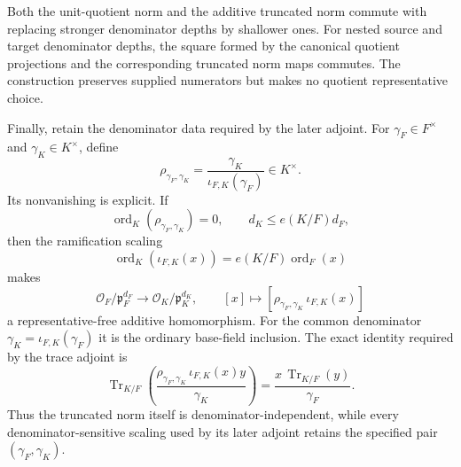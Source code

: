 \begin{definition}
Both the unit-quotient norm and the additive truncated norm commute with
replacing stronger denominator depths by shallower ones.  For nested
source and target denominator depths, the square formed by the canonical
quotient projections and the corresponding truncated norm maps commutes.
The construction preserves supplied numerators but makes no quotient
representative choice.

Finally, retain the denominator data required by the later adjoint.  For
$\gamma_F\in F^\times$ and $\gamma_K\in K^\times$, define
\[
 \rho_{\gamma_F,\gamma_K}
   =\frac{\gamma_K}{\iota_{F,K}(\gamma_F)}\in K^\times.
\]
Its nonvanishing is explicit.  If
\[
 \operatorname{ord}_K(\rho_{\gamma_F,\gamma_K})=0,
 \qquad d_K\leq e(K/F)d_F,
\]
then the ramification scaling
\[
 \operatorname{ord}_K(\iota_{F,K}(x))
   =e(K/F)\operatorname{ord}_F(x)
\]
makes
\[
 \mathcal O_F/\mathfrak p_F^{d_F}
 \longrightarrow
 \mathcal O_K/\mathfrak p_K^{d_K},
 \qquad
 [x]\longmapsto
 [\rho_{\gamma_F,\gamma_K}\,\iota_{F,K}(x)]
\]
a representative-free additive homomorphism.  For the common denominator
$\gamma_K=\iota_{F,K}(\gamma_F)$ it is the ordinary base-field inclusion.
The exact identity required by the trace adjoint is
\[
 \operatorname{Tr}_{K/F}\!\left(
   \frac{\rho_{\gamma_F,\gamma_K}\,
     \iota_{F,K}(x)y}{\gamma_K}\right)
 =
 \frac{x\,\operatorname{Tr}_{K/F}(y)}{\gamma_F}.
\]
Thus the truncated norm itself is denominator-independent, while every
denominator-sensitive scaling used by its later adjoint retains the
specified pair $(\gamma_F,\gamma_K)$.


\end{definition}
